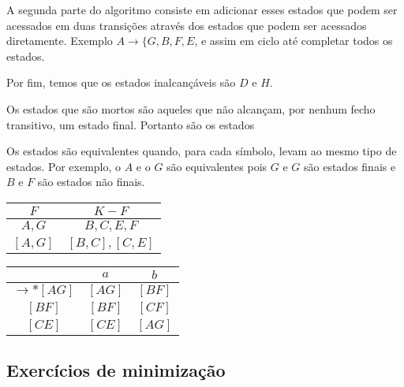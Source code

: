 \documentclass[]{article}
\begin{document}
A segunda parte do algoritmo consiste em adicionar esses estados que podem ser acessados em duas transições através dos estados que podem ser acessados diretamente. Exemplo $A \to \{ G, B,F, E$, e assim em ciclo até completar todos os estados.

Por fim, temos que os estados inalcançáveis são $D$ e $H$.

Os estados que são mortos são aqueles que não alcançam, por nenhum fecho transitivo, um estado final. Portanto são os estados

Os estados são equivalentes quando, para cada símbolo, levam ao mesmo tipo de estados. Por exemplo, o $A$ e o $G$ são equivalentes pois $G$ e $G$ são estados finais e $B$ e $F$ são estados não finais.

\begin{minipage}[t]{0.43\textwidth}
\begin{tabular}{|c|c|} %
            \toprule %
            $F$ & $K-F $\\
            \midrule %
		$A,G$ & $B,C,E,F$\\
		$[A,G]$ & $[B,C],[C,E]$\\
            \bottomrule %
        \end{tabular}
\end{minipage} 
\hfill
\begin{minipage}[t]{0.43\textwidth}
\begin{tabular}{|c|c|c|} %
            \toprule %
             & $a$ & $b$\\
            \midrule %
		$\to *[AG]$ & $[AG]$ & $[BF]$\\
		$[BF]$ & $[BF]$ & $[CF]$\\
		$[CE]$ & $[CE]$ & $[AG]$\\
		
            \bottomrule %
        \end{tabular}
\end{minipage} 

	\subsection{Exercícios de minimização}
\end{document}
